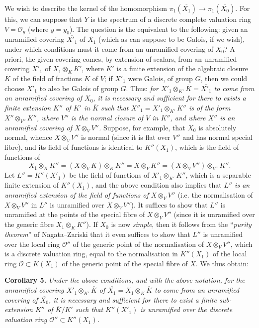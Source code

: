 \documentclass{article}
\newenvironment{itenv}[1]
  {\phantomsection\par\medskip\noindent\textbf{#1.}\itshape}
  {\medskip}
\newcommand{\scr}[1]{{\mathscr{#1}}}
\newcommand{\oldpage}[1]{\marginpar{\footnotesize$\Big\vert$ \textit{p.~#1}}}
\begin{document}
We wish to describe the kernel of the homomorphism $\pi_1(\overline{X_1})\to\pi_1(\overline{X_0})$.
For this, we can suppose that $Y$ is the spectrum of a discrete complete valuation ring $V=\scr{O}_y$ (where $y=y_0$).
The question is the equivalent to the following:
given an unramified covering $\overline{X'_1}$ of $\overline{X_1}$ (which as can suppose to be Galois, if we wish), under which conditions must it come from an unramified covering of $X_0$?
A priori, the given covering comes, by extension of scalars, from an unramified covering $X'_1$ of $X_1\otimes_KK'$, where $K'$ is a finite extension of the algebraic closure $\overline{K}$ of the field of fractions $K$ of $V$;
if $X'_1$ were Galois, of group $G$, then we could choose $X'_1$ to also be Galois of group $G$.
Thus: \emph{for $X'_1\otimes_{K'}\overline{K}=\overline{X'_1}$ to come from an unramified covering of $X_0$, it is necessary and sufficient for there to exists a finite extension $K''$ of $K'$ in $\overline{K}$ such that $X''_1=X'_1\otimes_{K'}K''$ is of the form $X''\otimes_{V''}K''$, where $V''$ is the normal closure of $V$ in $K''$, and where $X''$ is an unramified covering of $X\otimes_V V''$.}
Suppose, for example, that $X_0$ is absolutely normal, whence $X\otimes_V V''$ is normal (since it is flat over $V''$ and has normal special fibre), and its field of functions is identical to $K''(X_1)$, which is the field of functions of
\[
  X_1\otimes_K K'' = (X\otimes_VK)\otimes_KK'' = X\otimes_VK'' = (X\otimes_VV'')\otimes_{V''}K''.
\]
\oldpage{182-26}
Let $L''=K''(X'_1)$ be the field of functions of $X'_1\otimes_{K'}K''$, which is a separable finite extension of $K''(X_1)$, and the above condition also implies that \emph{$L''$ is an unramified extension of the field of functions of $X\otimes_VV''$} (i.e. the normalisation of $X\otimes_V V''$ in $L''$ is unramified over $X\otimes_VV''$).
It suffices to show that $L''$ is unramified at the points of the special fibre of $X\otimes_VV''$ (since it is unramified over the generic fibre $X_1\otimes_KK''$).
If $X_0$ is now \emph{simple}, then it follows from the ``\emph{purity theorem}'' of Nagata--Zariski that it even suffices to show that $L''$ is unramified over the local ring $\scr{O}''$ of the generic point of the normalisation of $X\otimes_VV''$, which is a discrete valuation ring, equal to the normalisation in $K''(X_1)$ of the local ring $\scr{O}\subset K(X_1)$ of the generic point of the special fibre of $X$.
We thus obtain:

\begin{itenv}{Corollary 5}
\label{theorem12corollary5}
  Under the above conditions, and with the above notation, for the unramified covering $X'_1\otimes_{K'}\overline{K}$ of $\overline{X_1}=X_1\otimes_K\overline{K}$ to come from an unramified covering of $\overline{X_0}$, it is necessary and sufficient for there to exist a finite sub-extension $K''$ of $\overline{K}/K'$ such that $K''(X'_1)$ is unramified over the discrete valuation ring $\scr{O}''\subset K''(X_1)$.
\end{itenv}
\end{document}

